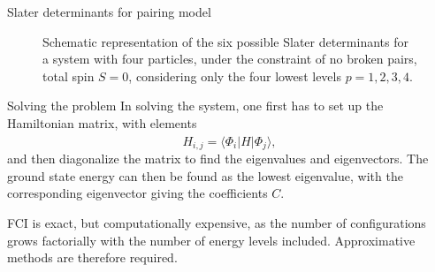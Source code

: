 \documentclass[UKenglish,aspectratio=169]{beamer}
\begin{document}
\begin{frame}{Slater determinants for pairing model}
    \begin{figure}[htbp]
        \centering
        
        \caption{
            Schematic representation of the six possible Slater determinants for a system with four particles, under the constraint of no broken pairs, total spin $S = 0$, considering only the four lowest levels $p = 1, 2, 3, 4$.\label{fig:SDs}
        }
    \end{figure}
\end{frame}

\begin{frame}{Solving the problem}
    In solving the system, one first has to set up the Hamiltonian matrix, with elements
    \begin{equation}
        H_{i, j} = \langle \Phi_i \lvert \hat{H} \rvert \Phi_j \rangle,
    \end{equation}
    and then diagonalize the matrix to find the eigenvalues and eigenvectors.
    The ground state energy can then be found as the lowest eigenvalue, with the corresponding eigenvector giving the coefficients $C$.

    \bigskip

    FCI is exact, but computationally expensive, as the number of configurations grows factorially with the number of energy levels included.
    Approximative methods are therefore required.
\end{frame}




\end{document}
